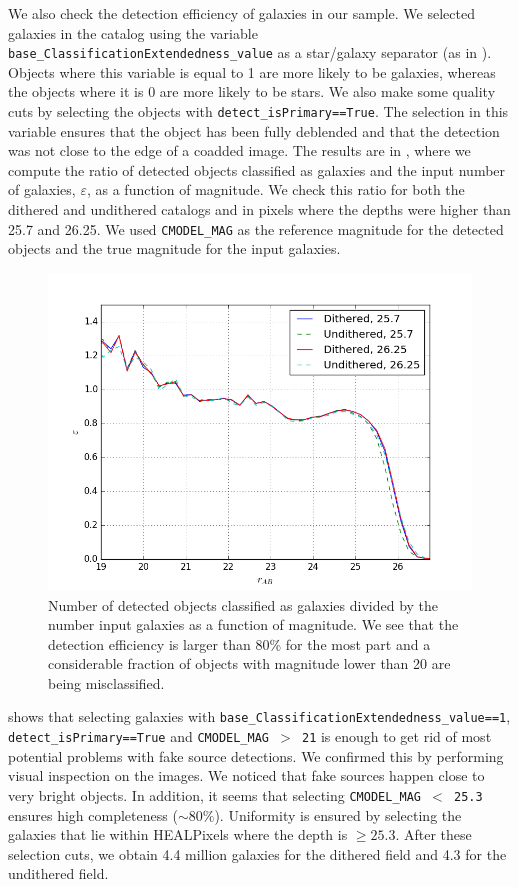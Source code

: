 \documentclass[twocolumn]{aastex62}
\begin{document}
We also check the detection efficiency of galaxies in our sample. We selected galaxies in the catalog using the variable \texttt{base\_ClassificationExtendedness\_value} as a star/galaxy separator (as in \citet{2017arXiv170506766B}). Objects where this variable is equal to 1 are more likely to be galaxies, whereas the objects where it is 0 are more likely to be stars. We also make some quality cuts by selecting the objects with \texttt{detect\_isPrimary==True}. The selection in this variable ensures that the object has been fully deblended and that the detection was not close to the edge of a coadded image. The results are in , where we compute the ratio of detected objects classified as galaxies and the input number of galaxies, $\varepsilon$, as a function of magnitude. We check this ratio for both the dithered and undithered catalogs and in pixels where the depths were higher than 25.7 and 26.25. We used \texttt{CMODEL\_MAG} as the reference magnitude for the detected objects and the true magnitude for the input galaxies.

\begin{figure}
\centering
\includegraphics[width=0.9\columnwidth]{completeness.png}
\caption{Number of detected objects classified as galaxies divided by the number input galaxies as a function of magnitude. We see that the detection efficiency is larger than 80\% for the most part and a considerable fraction of objects with magnitude lower than 20 are being misclassified.}
\label{fig:completeness}
\end{figure}

 shows that selecting galaxies with \texttt{base\_ClassificationExtendedness\_value==1}, \texttt{detect\_isPrimary==True} and \texttt{CMODEL\_MAG $>$ 21} is enough to get rid of most potential problems with fake source detections. We confirmed this by performing visual inspection on the images. We noticed that fake sources happen close to very bright objects. In addition, it seems that selecting \texttt{CMODEL\_MAG $<$ 25.3} ensures high completeness ($\sim 80\%$). Uniformity is ensured by selecting the galaxies that lie within HEALPixels where the depth is $\geq 25.3$. After these selection cuts, we obtain 4.4 million galaxies for the dithered field and 4.3 for the undithered field.
\end{document}
